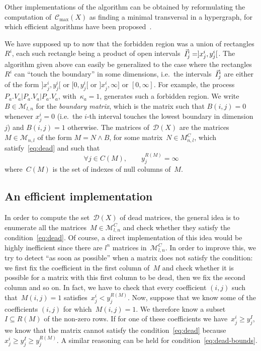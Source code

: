 \documentclass[orivec]{llncs} \usepackage[T1]{fontenc}
\newcommand{\C}{\mathcal{C}}
\newcommand{\ie}{i.e.~}
\renewcommand{\P}[1]{P_{#1}}
\newcommand{\V}[1]{V_{#1}}
\newcommand{\capacity}[1]{\kappa_{#1}}
\newcommand{\Mat}{\mathcal{M}}
\newcommand{\D}{\mathcal{D}}
\renewcommand{\geq}{\geqslant}
\renewcommand{\C}{\mathcal{C}}
\begin{document}
Other implementations of the algorithm can be obtained by reformulating the
computation of~$\C_{\max}(X)$ as finding a minimal transversal in a
hypergraph, 
for which efficient algorithms have been
proposed~\cite{kavvadias1999evaluation}.


We have supposed up to now that the forbidden region was a
union of rectangles~$R^i$, each such rectangle being a product of open
intervals~$\vec{I}^i_j=]x^i_j,y^i_j[$. The algorithm given above can easily be
generalized to the case where the rectangles~$R^i$ can ``touch the boundary'' in
some dimensions, \ie the intervals~$\vec{I}^i_j$ are either of the form
$]x^i_j,y^i_j[$ or $[0,y^i_j[$ or $]x^i_j,\infty]$ or $[0,\infty]$. For example,
the process $\P a.\V a|\P a.\V a|\P a.\V a$, with~$\capacity a=1$, generates
such a forbidden region. We write~$B\in \Mat_{l,n}$ for the \emph{boundary
  matrix}, which is the matrix such that $B(i,j)=0$ whenever $x^i_j=0$ (\ie the
$i$-th interval touches the lowest boundary in dimension~$j$) and
\hbox{$B(i,j)=1$} otherwise. The matrices of~$\D(X)$ are the matrices~$M\in
\Mat_{n,l}$ of the form \hbox{$M=N\wedge B$}, for some matrix~$N\in M^C_{n,l}$,
which satisfy~\eqref{eq:dead} and such that
\begin{equation}
  \label{eq:dead-bounds}
  \forall j\in C(M),
  \qquad
  y^{R(M)}_j=\infty
\end{equation}
where~$C(M)$ is the set of indexes of null columns of~$M$.

\subsection{An efficient implementation}
\label{sec:implem}
In order to compute the set~$\D(X)$ of dead matrices, the general idea is to
enumerate all the matrices~$M\in\Mat^C_{l,n}$ and check whether they satisfy the
condition~\eqref{eq:dead}. Of course, a direct implementation of this idea would
be highly inefficient since there are $l^n$ matrices in~$\Mat^C_{l,n}$. In order
to improve this, we try to detect ``as soon as possible'' when a matrix does not
satisfy the condition: we first fix the coefficient in the first column of~$M$
and check whether it is possible for a matrix with this first column to be dead,
then we fix the second column and so on. In fact, we have to check that every
coefficient $(i,j)$ such that~$M(i,j)=1$ satisfies~$x^i_j<y^{R(M)}_j$. Now,
suppose that we know some of the coefficients $(i,j)$ for which~$M(i,j)=1$. We
therefore know a subset~$I\subseteq R(M)$ of the non-zero rows. If for one of
these coefficients we have~$x^i_j\geq y^I_j$, we know that the matrix cannot
satisfy the condition~\eqref{eq:dead} because~$x^i_j\geq y^I_j\geq
y^{R(M)}_j$. A similar reasoning can be held for
condition~\eqref{eq:dead-bounds}.
\end{document}
